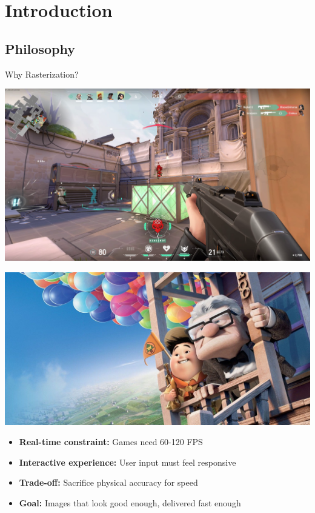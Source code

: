 \section{Introduction}
\subsection{Philosophy}

\begin{frame}{Why Rasterization?}
  \pause
  \begin{minipage}{0.45\textwidth}
    \centering
    \includegraphics[width=\linewidth]{images/valorant_gameplay.png}
  \end{minipage}%
  \hfill
  \pause
  \begin{minipage}{0.45\textwidth}
    \centering
    \includegraphics[width=\linewidth]{images/pixar_movie.jpg}
  \end{minipage}

  \begin{itemize}
    \item<3-> \textbf{Real-time constraint:} Games need 60-120 FPS
    \item<4-> \textbf{Interactive experience:} User input must feel responsive
    \item<5-> \textbf{Trade-off:} Sacrifice physical accuracy for speed
    \item<6-> \textbf{Goal:} Images that look good enough, delivered fast enough
  \end{itemize}
\end{frame}

